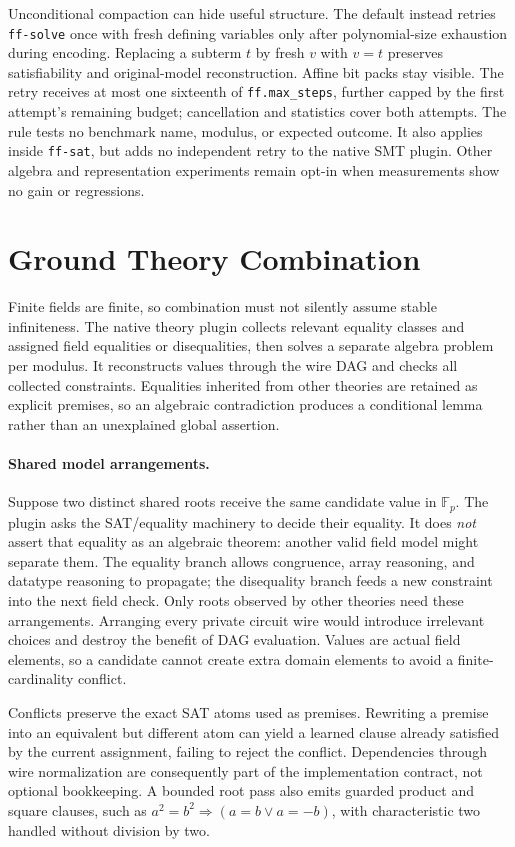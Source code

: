 \documentclass[runningheads]{llncs}
\newcommand{\FF}{\mathbb{F}}
\newcommand{\flag}[1]{\texttt{#1}}
\begin{document}
Unconditional compaction can hide useful structure. The default instead retries
\flag{ff-solve} once with fresh defining variables only after polynomial-size
exhaustion during encoding. Replacing a subterm $t$ by fresh $v$ with $v=t$
preserves satisfiability and original-model reconstruction. Affine bit packs stay
visible. The retry receives at most one sixteenth of \flag{ff.max\_steps},
further capped by the first attempt's remaining budget; cancellation and
statistics cover both attempts. The rule tests no benchmark name, modulus, or
expected outcome. It also applies inside \flag{ff-sat}, but adds no independent
retry to the native SMT plugin. Other algebra and representation experiments
remain opt-in when measurements show no gain or regressions.

\section{Ground Theory Combination}
\label{sec:combination}

Finite fields are finite, so combination must not silently assume stable
infiniteness. The native theory plugin collects relevant equality classes and
assigned field equalities or disequalities, then solves a separate algebra
problem per modulus. It reconstructs values through the wire DAG and checks
all collected constraints. Equalities inherited from other theories are retained
as explicit premises, so an algebraic contradiction produces a conditional
lemma rather than an unexplained global assertion.

\paragraph{Shared model arrangements.}
Suppose two distinct shared roots receive the same candidate value in $\FF_p$.
The plugin asks the SAT/equality machinery to decide their equality. It does
\emph{not} assert that equality as an algebraic theorem: another valid field
model might separate them. The equality branch allows congruence, array
reasoning, and datatype reasoning to propagate; the disequality branch feeds a
new constraint into the next field check. Only roots observed by other theories
need these arrangements. Arranging every private circuit wire would introduce
irrelevant choices and destroy the benefit of DAG evaluation. Values are actual
field elements, so a candidate cannot create extra domain elements to avoid a
finite-cardinality conflict.

Conflicts preserve the exact SAT atoms used as premises. Rewriting a premise
into an equivalent but different atom can yield a learned clause already
satisfied by the current assignment, failing to reject the conflict. Dependencies
through wire normalization are consequently part of the implementation contract,
not optional bookkeeping. A bounded root pass also emits guarded product and
square clauses, such as $a^2=b^2\Rightarrow(a=b\lor a=-b)$, with characteristic
two handled without division by two.
\end{document}
